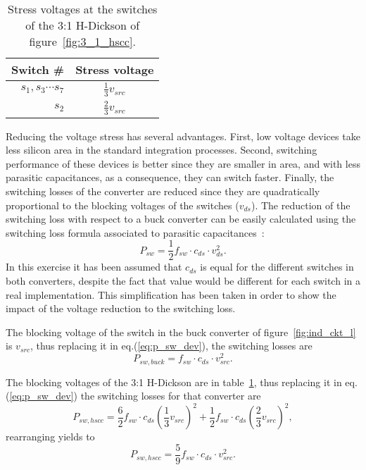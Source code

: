 \begin{table}[h]
\centering
\caption{Stress voltages at the switches of the 3:1 H-Dickson of figure~\ref{fig:3_1_hscc}.}
\label{tab:3:1 H-Dick_V_stress}
\renewcommand{\arraystretch}{1.5}%
\begin{tabular}{r  c }
 Switch \# & Stress voltage  \\
 \midrule
 $s_1,s_3 \cdots s_7$ & $\frac{1}{3} v_{src}$ \\
 $s_2$ & $\frac{2 }{3} v_{src}$
\end{tabular}
\end{table}

Reducing the voltage stress has several advantages. First, low voltage devices take less silicon area in the standard integration processes. Second, switching performance of these devices is better since they are smaller in area, and with less parasitic capacitances, as a consequence, they can switch faster. Finally, the switching losses of the converter are reduced since they are quadratically proportional to the blocking voltages of the switches ($v_{ds}$). The reduction of the switching loss with respect to a buck converter can be easily calculated using the switching loss formula associated to parasitic  capacitances~\cite{2001fundamentals_erickson}:
\begin{equation}
P_{sw} = \frac{1}{2} f_{sw} \cdot c_{ds} \cdot v_{ds}^2.
\label{eq:p_sw_dev}
\end{equation}
In this exercise it has been assumed that $c_{ds}$ is equal for the different switches in both converters, despite the fact that value would be different for each switch in a real implementation. This simplification has been taken in order to show the impact of the voltage reduction to the switching loss. %

The blocking voltage of the switch in the buck converter of figure~\ref{fig:ind_ckt_l} is $v_{src}$, thus replacing it in eq.(\ref{eq:p_sw_dev}), the switching losses are
\begin{equation}
P_{sw,buck} =   f_{sw} \cdot c_{ds} \cdot v_{src}^2.
\label{eq:p_sw_buck}
\end{equation}

The blocking voltages of the 3:1 H-Dickson are in table~\ref{tab:3:1 H-Dick_V_stress}, thus replacing it in eq.(\ref{eq:p_sw_dev}) the switching losses for that converter are
\begin{equation}
P_{sw,hscc} =  \frac{6}{2}  f_{sw} \cdot c_{ds} \left( \frac{1}{3} v_{src} \right)^2 + \frac{1}{2}  f_{sw} \cdot c_{ds} \left( \frac{2}{3} v_{src} \right)^2 ,
\label{eq:p_sw_hscc}
\end{equation}
rearranging yields to
\begin{equation}
P_{sw,hscc} =  \frac{5}{9}  f_{sw} \cdot c_{ds} \cdot v_{src}^2.
\label{eq:p_sw_hscc_sol}
\end{equation}

